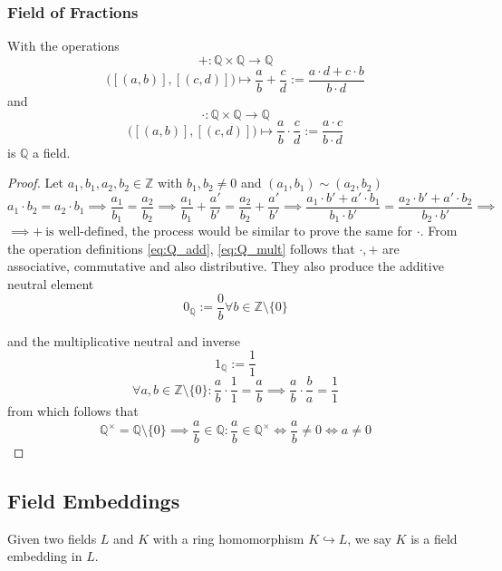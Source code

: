 \subsubsection{Field of Fractions}
\begin{proposition}\label{pro:Q_field}
   With the operations
   \[+: \mathbb{Q} \times \mathbb{Q} \to \mathbb{Q}\]
   \begin{equation}\label{eq:Q_add}
      \big([(a, b)], [(c, d)]\big) \mapsto \frac{a}{b} + \frac{c}{d} := \frac{a \cdot d + c \cdot b}{b \cdot d}
   \end{equation}
   and
   \[\cdot: \mathbb{Q} \times \mathbb{Q} \to \mathbb{Q}\]
   \begin{equation}\label{eq:Q_mult}
      \big([(a, b)], [(c, d)]\big) \mapsto \frac{a}{b} \cdot \frac{c}{d} := \frac{a \cdot c}{b \cdot d}
   \end{equation}
   is \(\mathbb{Q}\) a field.
\end{proposition}
\begin{proof}
   Let \(a_1, b_1, a_2, b_2 \in \mathbb{Z}\) with \(b_1, b_2 \neq 0\) and \((a_1, b_1) \sim (a_2, b_2)\)
   \[a_1 \cdot b_2 = a_2 \cdot b_1 \implies \frac{a_1}{b_1} = \frac{a_2}{b_2} \implies \frac{a_1}{b_1} + \frac{a'}{b'} = \frac{a_2}{b_2} + \frac{a'}{b'} \implies \frac{a_1 \cdot b' + a' \cdot b_1}{b_1 \cdot b'} = \frac{a_2 \cdot b' + a' \cdot b_2}{b_2 \cdot b'} \implies\]
   \(\implies +~\text{is well-defined}\), the process would be similar to prove the same for \(\cdot\).
   From the operation definitions \cref{eq:Q_add}, \cref{eq:Q_mult} follows that \(\cdot, +\) are associative, commutative and also distributive.
   They also produce the additive neutral element
   \[0_{\mathbb{Q}} := \frac{0}{b} \forall b \in \mathbb{Z} \setminus \{0\}\]

   and the multiplicative neutral and inverse
   \[1_{\mathbb{Q}} := \frac{1}{1}\]
   \[\forall a, b \in \mathbb{Z} \setminus \{0\}: \frac{a}{b} \cdot \frac{1}{1} = \frac{a}{b} \implies \frac{a}{b} \cdot \frac{b}{a} = \frac{1}{1}\]
   from which follows that
   \[\mathbb{Q}^{\times} = \mathbb{Q} \setminus \{0\} \implies \frac{a}{b} \in \mathbb{Q}: \frac{a}{b} \in \mathbb{Q}^{\times} \iff \frac{a}{b} \neq 0 \iff a \neq 0\]
\end{proof}

\subsection{Field Embeddings}
\begin{definition}
   Given two fields \(L\) and \(K\) with a ring homomorphism \(K \hookrightarrow L\), we say \(K\) is a field embedding in \(L\).
\end{definition}

